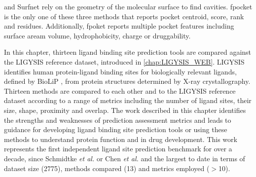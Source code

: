 \cite{HENDLICH_1997_LIGSITE} and Surfnet \cite{LASKOWSKI_1995_SURFNET} rely on the geometry of the molecular surface to find cavities. fpocket is the only one of these three methods that reports pocket centroid, score, rank and residues. Additionally, fpoket reports multiple pocket features including surface aream volume, hydrophobicity, charge or druggability. 

In this chapter, thirteen ligand binding site prediction tools are compared against the LIGYSIS reference dataset, introduced in \autoref{chap:LIGYSIS_WEB}. LIGYSIS identifies human protein-ligand binding sites for biologically relevant ligands, defined by BioLiP \cite{YANG_2013_BIOLIP}, from protein structures determined by X-ray crystallography. Thirteen methods are compared to each other and to the LIGYSIS reference dataset according to a range of metrics including the number of ligand sites, their size, shape, proximity and overlap. The work described in this chapter identifies the strengths and weaknesses of prediction assessment metrics and leads to guidance for developing ligand binding site prediction tools or using these methods to understand protein function and in drug development. This work represents the first independent ligand site prediction benchmark for over a decade, since Schmidtke \textit{et al.} \cite{SCHMIDTKE_2010_BENCHMARK} or Chen \textit{et al.} \cite{CHEN_2011_ASSESSMENT} and the largest to date in terms of dataset size (2775), methods compared (13) and metrics employed ($>$10).

